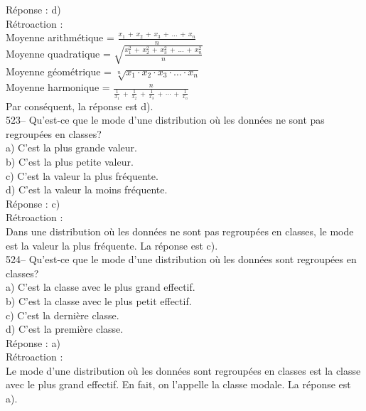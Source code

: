 ﻿\documentclass[letterpaper, 12pt]{article}
\begin{document}
R\'eponse : d)\\

R\'etroaction : \\
Moyenne arithm\'etique =
$\frac{x_1\,+\,x_2\,+\,x_3\,+\,\ldots\,+\,x_n}{n}$\\[2mm]
Moyenne quadratique =
$\sqrt{\frac{x_1^{2}\,+\,x_2^{2}\,+\,x_3^{2}\,+\,\ldots\,+\,x_n^{2}}{n}}$\\[2mm]
Moyenne g\'eom\'etrique = $\sqrt[n]{x_1\cdot x_2\cdot x_3 \cdot \ldots \cdot
x_n}$\\[2mm]
Moyenne harmonique =
$\frac{n}{\frac{1}{x_1}\,+\,\frac{1}{x_2}\,+\,\frac{1}{x_3}\,+\,\cdots\,+\,\frac{1}{x_n}}$\\[2mm]
Par cons\'equent, la r\'eponse est d).\\

523-- Qu'est-ce que le mode d'une distribution o\`u les donn\'ees ne sont
pas regroup\'ees en classes?\\
a) C'est la plus grande valeur.\\
b) C'est la plus petite valeur.\\
c) C'est la valeur la plus fr\'equente.\\
d) C'est la valeur la moins fr\'equente.\\

R\'eponse : c)\\

R\'etroaction : \\
Dans une distribution o\`u les donn\'ees ne sont pas regroup\'ees en
classes, le mode est la valeur la plus fr\'equente.  La r\'eponse est c).\\

524-- Qu'est-ce que le mode d'une distribution o\`u les donn\'ees sont
regroup\'ees en classes?\\
a) C'est la classe avec le plus grand effectif.\\
b) C'est la classe avec le plus petit effectif.\\
c) C'est la derni\`ere classe.\\
d) C'est la premi\`ere classe.\\

R\'eponse : a)\\

R\'etroaction : \\
Le mode d'une distribution o\`u les donn\'ees sont regroup\'ees en classes
est la classe avec le plus grand effectif.  En fait, on l'appelle la classe
modale.  La r\'eponse est a).\\
\end{document}
